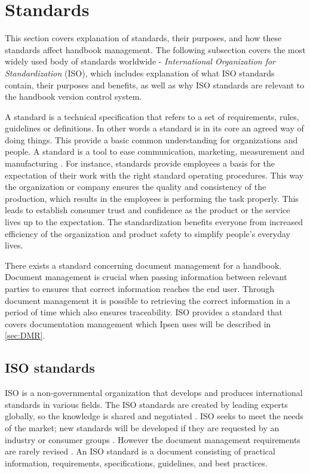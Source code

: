 \section{Standards} \label{sec:standards}
This section covers explanation of standards, their purposes, and how these standards affect handbook management.
The following subsection covers the most widely used body of standards worldwide - \textit{International Organization for Standardization} (ISO)\cite{ISOworldwidemostused}, which includes explanation of what ISO standards contain, their purposes and benefits, as well as why ISO standards are relevant to the handbook version control system.

A standard is a technical specification that refers to a set of requirements, rules, guidelines or definitions\citep[p.~5]{Standard}.
In other words a standard is in its core an agreed way of doing things.
This provide a basic common understanding for organizations and people.
A standard is a tool to ease communication, marketing, measurement and manufacturing \cite{Standardtool}.
For instance, standards provide employees a basis for the expectation of their work with the right standard operating procedures.
This way the organization or company ensures the quality and consistency of the production, which results in the employees is performing the task properly.
This leads to establish consumer trust and confidence as the product or the service lives up to the expectation.
The standardization benefits everyone from increased efficiency of the organization and product safety to simplify people's everyday lives\citep[p.~83]{Standardization}.

There exists a standard concerning document management for a handbook.
Document management is crucial when passing information between relevant parties to ensures that correct information reaches the end user.
Through document management it is possible to retrieving the correct information in a period of time which also ensures traceability.
ISO provides a standard that covers documentation management which Ipsen uses will be described in \cref{sec:DMR}.

\subsection{ISO standards} \label{sec:ISOstandards}
ISO is a non-governmental organization that develops and produces international standards in various fields.
The ISO standards are created by leading experts globally, so the knowledge is shared and negotiated \cite{ISOinfo}.
ISO seeks to meet the needs of the market; new standards will be developed if they are requested by an industry or consumer groups \cite{ISOdeveloping}.
However the document management requirements are rarely revised \cite{Ipsenfirstinterview}.
An ISO standard is a document consisting of practical information, requirements, specifications, guidelines, and best practices\cite{ISOreviewedevery5years}.

